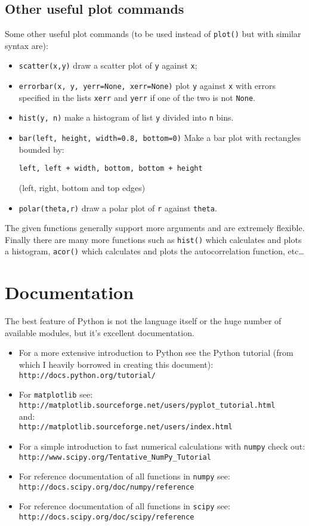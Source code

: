 \documentclass[10pt,a4paper]{article}
\begin{document}
\subsection{Other useful plot commands}
Some other useful plot commands (to be used instead of \verb|plot()| but with similar syntax are):
\begin{itemize}
\item \verb|scatter(x,y)| draw a scatter plot of \verb|y| against \verb|x|;
\item \verb|errorbar(x, y, yerr=None, xerr=None)| plot \verb|y| against \verb|x| with errors specified in the lists \verb|xerr| and \verb|yerr| if one of the two is not \verb|None|.
\item \verb|hist(y, n)| make a histogram of list \verb|y| divided into \verb|n| bins.
\item \verb|bar(left, height, width=0.8, bottom=0)| Make a bar plot with rectangles bounded by:
\begin{Verbatim}
left, left + width, bottom, bottom + height
\end{Verbatim}
(left, right, bottom and top edges)
\item \verb|polar(theta,r)| draw a polar plot of \verb|r| against \verb|theta|.
\end{itemize}
The given functions generally support more arguments and are extremely flexible.
Finally there are many more functions such as \verb|hist()| which calculates and plots a histogram, \verb|acor()| which calculates and plots the autocorrelation function, etc\ldots
\appendix
\section{Documentation}
The best feature of Python is not the language itself or the huge number of available modules, but it's excellent documentation.
\begin{itemize}
\item For a more extensive introduction to Python see the Python tutorial (from which I heavily borrowed in creating this document):\\
\verb|http://docs.python.org/tutorial/|
\item For \verb|matplotlib| see:\\
\verb|http://matplotlib.sourceforge.net/users/pyplot_tutorial.html|\\
and:\\
\verb|http://matplotlib.sourceforge.net/users/index.html|
\item For a simple introduction to fast numerical calculations with \verb|numpy| check out:
\verb|http://www.scipy.org/Tentative_NumPy_Tutorial|
\item For reference documentation of all functions in \verb|numpy| see:\\
\verb|http://docs.scipy.org/doc/numpy/reference|
\item For reference documentation of all functions in \verb|scipy| see:\\
\verb|http://docs.scipy.org/doc/scipy/reference|
\end{itemize}
\end{document}
